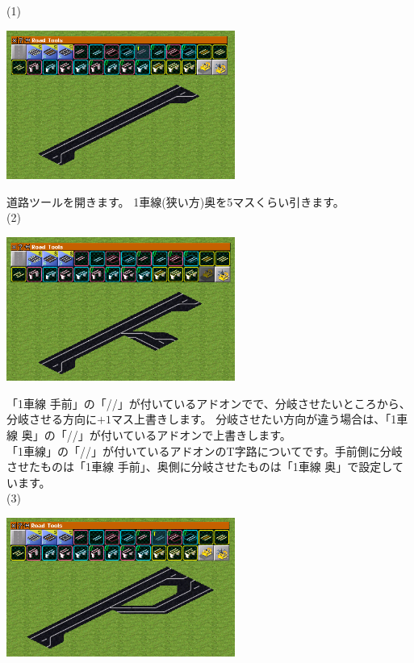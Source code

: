 \documentclass{jbook}
\begin{document}
\begin{multicols}{2}


  (1)

\includegraphics[width = 75mm]{picture/20210214-road-2-1.png}

道路ツールを開きます。
1車線(狭い方)奥を5マスくらい引きます。\\


(2)

\includegraphics[width = 75mm]{picture/20210214-road-2-2.png}

「1車線 手前」の「//」が付いているアドオンでで、分岐させたいところから、分岐させる方向に$+1$マス上書きします。
分岐させたい方向が違う場合は、「1車線 奥」の「//」が付いているアドオンで上書きします。\\

「1車線」の「//」が付いているアドオンのT字路についてです。手前側に分岐させたものは「1車線 手前」、奥側に分岐させたものは「1車線 奥」で設定しています。\\

(3)


\includegraphics[width = 75mm]{picture/20210214-road-2-3.png}


\end{multicols}
\end{document}
